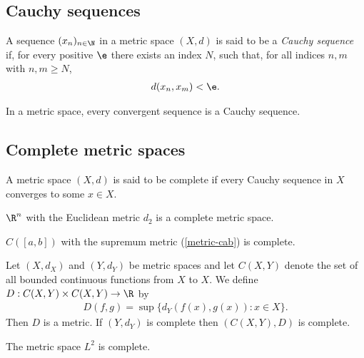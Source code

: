 \documentclass{article}
\begin{document}
\subsection{Cauchy sequences}

\begin{definition}
	A sequence $(x_n)_{n\in\N}$ in a metric space $(X,d)$ is said to be a \emph{Cauchy sequence}
	if, for every positive $\e$ there exists an index $N$, such that, for all indices $n,m$ with
	$n,m\geq N$,
	\begin{align*}
		d(x_n,x_m)<\e.
	\end{align*}
\end{definition}

\begin{proposition}[7.2]
	In a metric space, every convergent sequence is a Cauchy sequence.
\end{proposition}

\subsection{Complete metric spaces}

\begin{definition}
	A metric space $(X,d)$ is said to be complete if every Cauchy sequence in $X$ converges to some
	$x\in X$.
\end{definition}

\begin{proposition}[7.5]
	$\R^n$ with the Euclidean metric $d_2$ is a complete metric space.
\end{proposition}

\begin{proposition}[7.6]
	$C([a,b])$ with the supremum metric (\vref{metric-cab}) is complete.
\end{proposition}

\begin{proposition}[7.7]
	Let $(X,d_X)$ and $(Y,d_Y)$ be metric spaces and let $C(X,Y)$ denote the set of all
	bounded continuous functions from $X$ to $X$. We define $D:C(X,Y)\times C(X,Y)\to\R$
	by
	\begin{align*}
		D(f,g)=\sup\{d_Y(f(x),g(x)):x\in X\}.
	\end{align*}
	Then $D$ is a metric. If $(Y,d_Y)$ is complete then $(C(X,Y),D)$ is complete.
\end{proposition}

\begin{proposition}[7.8]
	The metric space $L^2$ is complete.
\end{proposition}
\end{document}
